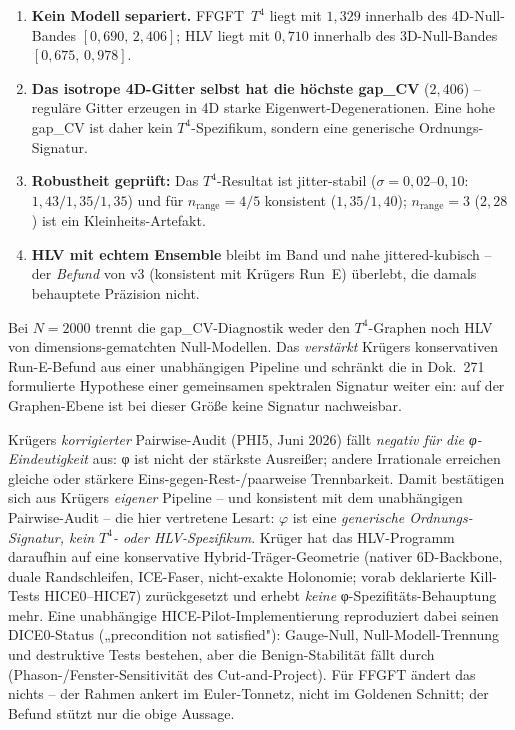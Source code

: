 \begin{enumerate}
  \item \textbf{Kein Modell separiert.} FFGFT~$T^4$ liegt mit
        $1{,}329$ innerhalb des 4D-Null-Bandes $[0{,}690,\,2{,}406]$;
        HLV liegt mit $0{,}710$ innerhalb des 3D-Null-Bandes
        $[0{,}675,\,0{,}978]$.
  \item \textbf{Das isotrope 4D-Gitter selbst hat die höchste gap\_CV}
        ($2{,}406$) -- reguläre Gitter erzeugen in 4D starke
        Eigenwert-Degenerationen. Eine hohe gap\_CV ist daher kein
        $T^4$-Spezifikum, sondern eine generische Ordnungs-Signatur.
  \item \textbf{Robustheit geprüft:} Das $T^4$-Resultat ist
        jitter-stabil ($\sigma=0{,}02$--$0{,}10$: $1{,}43/1{,}35/1{,}35$)
        und für $n_\mathrm{range}=4/5$ konsistent ($1{,}35/1{,}40$);
        $n_\mathrm{range}=3$ ($2{,}28$) ist ein
        Kleinheits-Artefakt.
  \item \textbf{HLV mit echtem Ensemble} bleibt im Band und
        nahe jittered-kubisch -- der \emph{Befund} von v3 (konsistent
        mit Krügers Run~E) überlebt, die damals behauptete Präzision
        nicht.
\end{enumerate}

\begin{remark}
Bei $N=2000$ trennt die gap\_CV-Diagnostik weder den
$T^4$-Graphen noch HLV von dimensions-gematchten Null-Modellen.
Das \emph{verstärkt} Krügers konservativen Run-E-Befund aus einer
unabhängigen Pipeline und schränkt die in Dok.~271 formulierte
Hypothese einer gemeinsamen spektralen Signatur weiter ein: auf der
Graphen-Ebene ist bei dieser Größe keine Signatur nachweisbar.
\end{remark}

\begin{remark}
Krügers \emph{korrigierter} Pairwise-Audit (PHI5, Juni 2026) fällt
\emph{negativ für die φ-Eindeutigkeit} aus: φ ist nicht der stärkste Ausreißer;
andere Irrationale erreichen gleiche oder stärkere Eins-gegen-Rest-/paarweise
Trennbarkeit. Damit bestätigen sich aus Krügers \emph{eigener} Pipeline -- und
konsistent mit dem unabhängigen Pairwise-Audit -- die hier vertretene Lesart: $\varphi$
ist eine \emph{generische Ordnungs-Signatur, kein $T^4$- oder HLV-Spezifikum}. Krüger
hat das HLV-Programm daraufhin auf eine konservative Hybrid-Träger-Geometrie (nativer
6D-Backbone, duale Randschleifen, ICE-Faser, nicht-exakte Holonomie; vorab deklarierte
Kill-Tests HICE0--HICE7) zurückgesetzt und erhebt \emph{keine} φ-Spezifitäts-Behauptung
mehr. Eine unabhängige HICE-Pilot-Implementierung reproduziert dabei seinen
DICE0-Status („precondition not satisfied"): Gauge-Null, Null-Modell-Trennung und
destruktive Tests bestehen, aber die Benign-Stabilität fällt durch (Phason-/Fenster-Sensitivität
des Cut-and-Project). Für FFGFT ändert das nichts -- der Rahmen ankert im
Euler-Tonnetz, nicht im Goldenen Schnitt; der Befund stützt nur die obige Aussage.
\end{remark}

